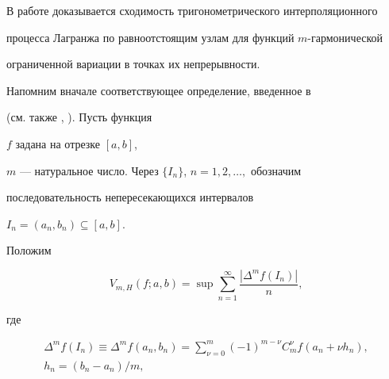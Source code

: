 \pagestyle{plain} %













\maketitle













В работе доказывается сходимость тригонометрического интерполяционного


процесса Лагранжа по равноотстоящим узлам для функций $m$-гармонической


ограниченной вариации в точках их непрерывности.





Напомним вначале соответствующее определение, введенное в \cite{K1}


(см. также \cite{K2}, \cite{K3}). Пусть функция


$f$ задана на отрезке $[a,b]$,


$m$ --- натуральное число. Через $\{I_n\}$, $n=1,2,\dotsc,$ обозначим


последовательность непересекающихся интервалов


$I_n=(a_n,b_n)\subseteq[a,b]$.





Положим


\begin{equation}


V_{m,H}(f;a,b)=\sup\sum^{\infty}_{n=1}


\frac{|\Delta^mf(I_n)|}{n},


\end{equation}


где


\begin{gather*}


\Delta^mf(I_n)\equiv \Delta^mf(a_n,b_n)=\sum^m_{\nu=0}


(-1)^{m-\nu}C^\nu_mf(a_n+\nu h_n),\\


h_n=(b_n-a_n)/m,


\end{gather*}


